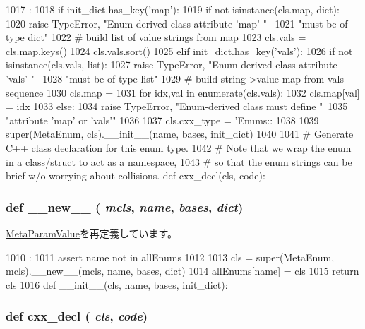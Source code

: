 \begin{DoxyCode}
1017                                              :
1018         if init_dict.has_key('map'):
1019             if not isinstance(cls.map, dict):
1020                 raise TypeError, "Enum-derived class attribute 'map' " \
1021                       "must be of type dict"
1022             # build list of value strings from map
1023             cls.vals = cls.map.keys()
1024             cls.vals.sort()
1025         elif init_dict.has_key('vals'):
1026             if not isinstance(cls.vals, list):
1027                 raise TypeError, "Enum-derived class attribute 'vals' " \
1028                       "must be of type list"
1029             # build string->value map from vals sequence
1030             cls.map = {}
1031             for idx,val in enumerate(cls.vals):
1032                 cls.map[val] = idx
1033         else:
1034             raise TypeError, "Enum-derived class must define "\
1035                   "attribute 'map' or 'vals'"
1036 
1037         cls.cxx_type = 'Enums::%
1038 
1039         super(MetaEnum, cls).__init__(name, bases, init_dict)
1040 
1041     # Generate C++ class declaration for this enum type.
1042     # Note that we wrap the enum in a class/struct to act as a namespace,
1043     # so that the enum strings can be brief w/o worrying about collisions.
    def cxx_decl(cls, code):
\end{DoxyCode}
\hypertarget{classm5_1_1params_1_1MetaEnum_a2f15a4676204349e06bcced484b06b70}{
\subsubsection[{\_\-\_\-new\_\-\_\-}]{\setlength{\rightskip}{0pt plus 5cm}def \_\-\_\-new\_\-\_\- ( {\em mcls}, \/   {\em name}, \/   {\em bases}, \/   {\em dict})}}
\label{classm5_1_1params_1_1MetaEnum_a2f15a4676204349e06bcced484b06b70}


\hyperlink{classm5_1_1params_1_1MetaParamValue_a2f15a4676204349e06bcced484b06b70}{MetaParamValue}を再定義しています。


\begin{DoxyCode}
1010                                         :
1011         assert name not in allEnums
1012 
1013         cls = super(MetaEnum, mcls).__new__(mcls, name, bases, dict)
1014         allEnums[name] = cls
1015         return cls
1016 
    def __init__(cls, name, bases, init_dict):
\end{DoxyCode}
\hypertarget{classm5_1_1params_1_1MetaEnum_a723cbb1dc9ae0e7f3d102c6678f181c0}{
\subsubsection[{cxx\_\-decl}]{\setlength{\rightskip}{0pt plus 5cm}def cxx\_\-decl ( {\em cls}, \/   {\em code})}}
\label{classm5_1_1params_1_1MetaEnum_a723cbb1dc9ae0e7f3d102c6678f181c0}



